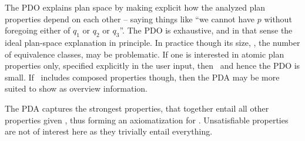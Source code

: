 %

The PDO explains plan space by making explicit how the analyzed plan
properties depend on each other -- saying things like ``we cannot have
$p$ without foregoing either of $q_1$ or $q_2$ or $q_3$''. The PDO is
exhaustive, and in that sense the ideal plan-space explanation in
principle. In practice though its size, \ie, the number of equivalence
classes, may be problematic. If one is interested in atomic plan
properties only, specified explicitly in the user input, then
\props\ and hence the PDO is small. If \props\ includes composed
properties though, then the PDA may be more suited to show as overview
information.

The PDA captures the strongest properties, that together entail all
other properties given \plans, thus forming an axiomatization for
\plans. Unsatisfiable properties are not of interest here as they
trivially entail everything. 
%
%

%

